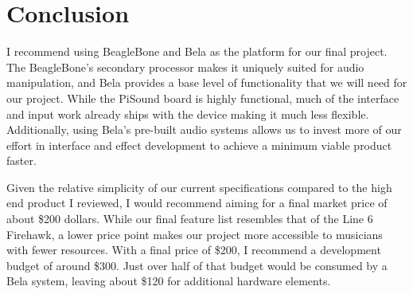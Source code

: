 \documentclass[journal,onecolumn,draftclsnofoot]{IEEEtran}
\begin{document}
\section{Conclusion}
I recommend using BeagleBone and Bela as the platform for our final project. The BeagleBone's secondary processor makes it uniquely suited for audio manipulation, and Bela provides a base level of functionality that we will need for our project. While the PiSound board is highly functional, much of the interface and input work already ships with the device making it much less flexible. Additionally, using Bela's pre-built audio systems allows us to invest more of our effort in interface and effect development to achieve a minimum viable product faster.

Given the relative simplicity of our current specifications compared to the high end product I reviewed, I would recommend aiming for a final market price of about \$200 dollars. While our final feature list resembles that of the Line 6 Firehawk, a lower price point makes our project more accessible to musicians with fewer resources. With a final price of \$200, I recommend a development budget of around \$300. Just over half of that budget would be consumed by a Bela system, leaving about \$120 for additional hardware elements.
\newpage
\end{document}
